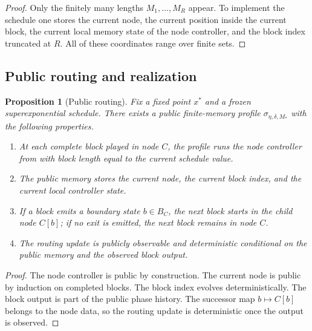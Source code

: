 \documentclass[12pt]{article}
\newtheorem{proposition}[theorem]{Proposition}
\theoremstyle{definition}
\newcommand{\1}{\mathbf{1}}
\begin{document}
\begin{proof}
Only the finitely many lengths $M_1,\dots,M_R$ appear.  To implement the schedule
one stores the current node, the current position inside the current block, the
current local memory state of the node controller, and the block index truncated at
$R$.  All of these coordinates range over finite sets.
\end{proof}

\subsection{Public routing and realization}

\begin{proposition}[Public routing]
\label{prop:public-routing}
Fix a fixed point $x^*$ and a frozen superexponential schedule.  There exists a
public finite-memory profile $\sigma_{\eta,\delta,M_*}$ with the following
properties.
\begin{enumerate}[label=\textnormal{(R\arabic*)},leftmargin=2.8em]
\item At each complete block played in node $C$, the profile runs the node
controller from  with block length equal to the current
schedule value.
\item The public memory stores the current node, the current block index, and the
current local controller state.
\item If a block emits a boundary state $b\in B_C$, the next block starts in the
child node $C[b]$; if no exit is emitted, the next block remains in node $C$.
\item The routing update is publicly observable and deterministic conditional on the
public memory and the observed block output.
\end{enumerate}
\end{proposition}

\begin{proof}
The node controller is public by construction.  The current node is public by
induction on completed blocks.  The block index evolves deterministically.  The
block output is part of the public phase history.  The successor map
$b\mapsto C[b]$ belongs to the node data, so the routing update is deterministic
once the output is observed.
\end{proof}
\end{document}
